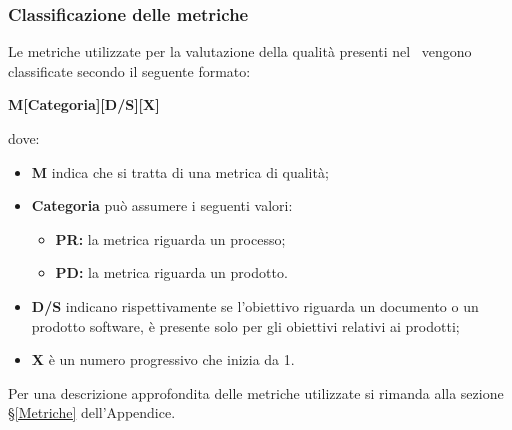 \subsubsection{Classificazione delle metriche}\label{ClassificazioneMetriche}
Le metriche utilizzate per la valutazione della qualità presenti nel \ vengono classificate secondo il seguente formato:
\begin{center}
	\textbf{M[Categoria][D/S][X]}
\end{center}
dove: 
\begin{itemize}
	\item \textbf{M} indica che si tratta di una metrica di qualità;
	\item \textbf{Categoria} può assumere i seguenti valori:
	\begin{itemize}
		\item \textbf{PR:} la metrica riguarda un processo;
		\item \textbf{PD:} la metrica riguarda un prodotto.
	\end{itemize}
	\item \textbf{D/S} indicano rispettivamente se l'obiettivo riguarda un documento o un prodotto software, è presente solo per gli obiettivi relativi ai prodotti;
	\item \textbf{X} è un numero progressivo che inizia da 1.
\end{itemize}
Per una descrizione approfondita delle metriche utilizzate si rimanda alla sezione \S\ref{Metriche} dell'Appendice.